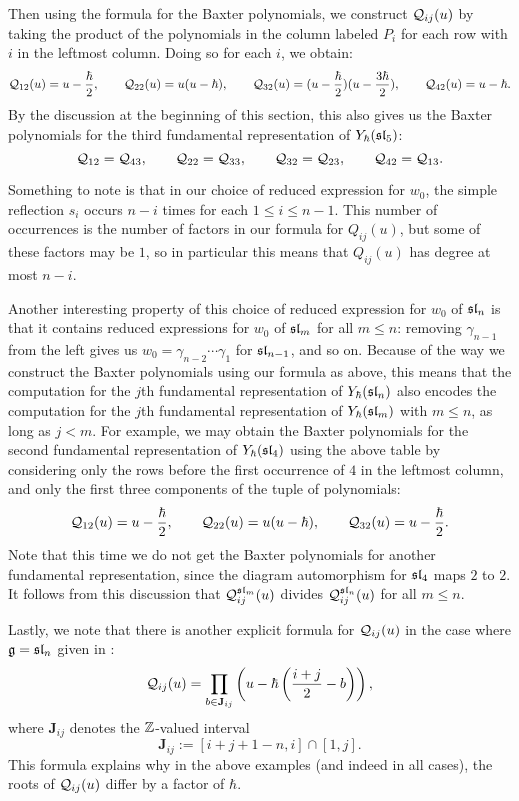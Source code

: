 Then using the formula for the Baxter polynomials, we construct $\mathcal{Q}_{ij}(u)$ by taking the product of the polynomials in the column labeled $P_i$ for each row with $i$ in the leftmost column.
Doing so for each $i$, we obtain:
\[\mathcal{Q}_{12}(u) = u-\frac{\hbar}{2}, \qquad
\mathcal{Q}_{22}(u) = u(u-\hbar), \qquad
\mathcal{Q}_{32}(u) = (u-\frac{\hbar}{2})(u-\frac{3\hbar}{2}), \qquad
\mathcal{Q}_{42}(u) = u-\hbar.\]
By the discussion at the beginning of this section, this also gives us the Baxter polynomials for the third fundamental representation of $Y_\hbar(\mathfrak{sl}_5)$:
\[\mathcal{Q}_{12} = \mathcal{Q}_{43}, \qquad
\mathcal{Q}_{22} = \mathcal{Q}_{33}, \qquad
\mathcal{Q}_{32} = \mathcal{Q}_{23}, \qquad
\mathcal{Q}_{42} = \mathcal{Q}_{13}.\]

Something to note is that in our choice of reduced expression for $w_0$, the simple reflection $s_i$ occurs $n-i$ times for each $1\leq i\leq n-1$.
This number of occurrences is the number of factors in our formula for $Q_{ij}(u)$, but some of these factors may be $1$, so in particular this means that $Q_{ij}(u)$ has degree at most $n-i$.

Another interesting property of this choice of reduced expression for $w_0$ of $\mathfrak{sl}_n$ is that it contains reduced expressions for $w_0$ of $\mathfrak{sl}_m$ for all $m\leq n$: removing $\gamma_{n-1}$ from the left gives us $w_0=\gamma_{n-2}\cdots\gamma_1$ for $\mathfrak{sl}_{n-1}$, and so on.
Because of the way we construct the Baxter polynomials using our formula as above, this means that the computation for the $j$th fundamental representation of $Y_\hbar(\mathfrak{sl}_n)$ also encodes the computation for the $j$th fundamental representation of $Y_\hbar(\mathfrak{sl}_m)$ with $m\leq n$, as long as $j<m$.
For example, we may obtain the Baxter polynomials for the second fundamental representation of $Y_\hbar(\mathfrak{sl}_4)$ using the above table by considering only the rows before the first occurrence of $4$ in the leftmost column, and only the first three components of the tuple of polynomials:
\[\mathcal{Q}_{12}(u) = u-\frac{\hbar}{2}, \qquad
\mathcal{Q}_{22}(u) = u(u-\hbar), \qquad
\mathcal{Q}_{32}(u) = u-\frac{\hbar}{2}.\]
Note that this time we do not get the Baxter polynomials for another fundamental representation, since the diagram automorphism for $\mathfrak{sl}_4$ maps $2$ to $2$.
It follows from this discussion that  $\mathcal{Q}_{ij}^{\mathfrak{sl}_m}(u)$ divides $\mathcal{Q}_{ij}^{\mathfrak{sl}_n}(u)$ for all $m\leq n$.

Lastly, we note that there is another explicit formula for $\mathcal{Q}_{ij}(u)$ in the case where $\mathfrak{g}=\mathfrak{sl}_n$ given in \cite[Cor. 5.5]{gautam_poles_2023}:
\[\mathcal{Q}_{ij}(u) = \prod_{b\in\mathbf{J}_{ij}}\left(u-\hbar\left(\frac{i+j}{2}-b\right)\right),\]
where $\mathbf{J}_{ij}$ denotes the $\mathbb{Z}$-valued interval
\[\mathbf{J}_{ij} := [i+j+1-n, i] \cap [1, j].\]
This formula explains why in the above examples (and indeed in all cases), the roots of $\mathcal{Q}_{ij}(u)$ differ by a factor of $\hbar$.
